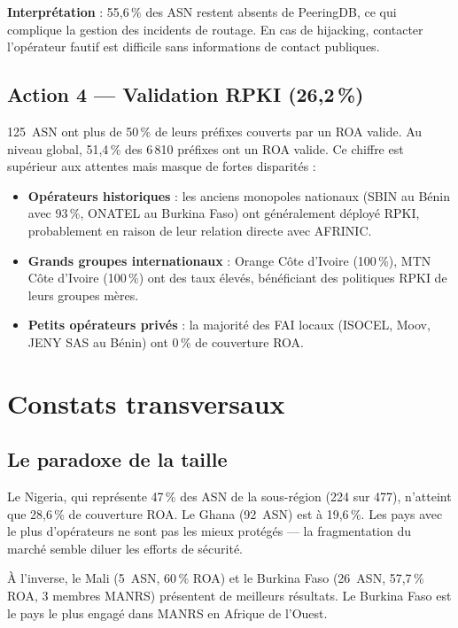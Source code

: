 \documentclass{eneam}
\begin{document}
\textbf{Interprétation} : 55,6\,\% des ASN restent absents de PeeringDB, ce qui complique la gestion des incidents de routage. En cas de hijacking, contacter l'opérateur fautif est difficile sans informations de contact publiques.

\subsection{Action 4 --- Validation RPKI (26,2\,\%)}

125~ASN ont plus de 50\,\% de leurs préfixes couverts par un ROA valide. Au niveau global, 51,4\,\% des 6\,810 préfixes ont un ROA valide. Ce chiffre est supérieur aux attentes mais masque de fortes disparités :

\begin{itemize}
    \item \textbf{Opérateurs historiques} : les anciens monopoles nationaux (SBIN au Bénin avec 93\,\%, ONATEL au Burkina Faso) ont généralement déployé RPKI, probablement en raison de leur relation directe avec AFRINIC.
    \item \textbf{Grands groupes internationaux} : Orange Côte d'Ivoire (100\,\%), MTN Côte d'Ivoire (100\,\%) ont des taux élevés, bénéficiant des politiques RPKI de leurs groupes mères.
    \item \textbf{Petits opérateurs privés} : la majorité des FAI locaux (ISOCEL, Moov, JENY SAS au Bénin) ont 0\,\% de couverture ROA.
\end{itemize}

\section{Constats transversaux}

\subsection{Le paradoxe de la taille}

Le Nigeria, qui représente 47\,\% des ASN de la sous-région (224 sur 477), n'atteint que 28,6\,\% de couverture ROA. Le Ghana (92~ASN) est à 19,6\,\%. Les pays avec le plus d'opérateurs ne sont pas les mieux protégés --- la fragmentation du marché semble diluer les efforts de sécurité.

À l'inverse, le Mali (5~ASN, 60\,\% ROA) et le Burkina Faso (26~ASN, 57,7\,\% ROA, 3 membres MANRS) présentent de meilleurs résultats. Le Burkina Faso est le pays le plus engagé dans MANRS en Afrique de l'Ouest.
\end{document}
